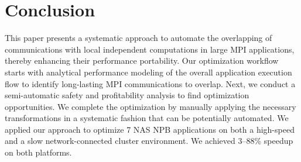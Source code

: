 \section{Conclusion}
\label{sec-concl}

This paper presents a systematic approach to automate the overlapping of  communications with local independent computations in large MPI applications, thereby enhancing their performance portability.
Our optimization workflow starts with analytical performance modeling of the overall application execution flow to identify long-lasting MPI communications to overlap. Next, we conduct a semi-automatic safety and profitability analysis to find optimization opportunities. We complete the optimization by manually applying the necessary transformations in a systematic fashion that can be potentially automated. 
We applied our approach to optimize 7 NAS NPB applications on both a high-speed and a slow network-connected cluster environment. We achieved 3--88\% speedup on both platforms.




